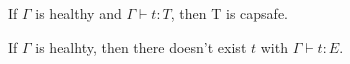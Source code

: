 

\begin{lemma}
  If $\Gamma$ is healthy and $\Gamma \vdash t : T$, then T is capsafe.
\end{lemma}

\begin{theorem}
  If $\Gamma$ is healhty, then there doesn't exist $t$ with
  $\Gamma \vdash t : E$.
\end{theorem}


